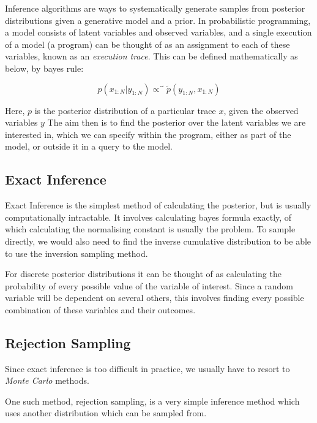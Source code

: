 Inference algorithms are ways to systematically generate samples from posterior distributions given a generative model and a prior. In probabilistic programming, a model consists of latent variables and observed variables, and a single execution of a model (a program) can be thought of as an assignment to each of these variables, known as an \textit{execution trace}. This can be defined mathematically as below, by bayes rule:

$$p(x_{1:N}|y_{1:N})\propto ̃\tilde{p}(y_{1:N},x_{1:N})$$ 

Here, $p$ is the posterior distribution of a particular trace $x$, given the observed variables $y$
The aim then is to find the posterior over the latent variables we are interested in, which we can specify within the program, either as part of the model, or outside it in a query to the model.

\subsection{Exact Inference}

Exact Inference is the simplest method of calculating the posterior, but is usually computationally intractable. It involves calculating bayes formula exactly, of which calculating the normalising constant is usually the problem. To sample directly, we would also need to find the inverse cumulative distribution to be able to use the inversion sampling method.

For discrete posterior distributions it can be thought of as calculating the probability of every possible value of the variable of interest. Since a random variable will be dependent on several others, this involves finding every possible combination of these variables and their outcomes.

\subsection{Rejection Sampling}

Since exact inference is too difficult in practice, we usually have to resort to \textit{Monte Carlo} \cite{monte-carlo} methods.

One such method, rejection sampling, is a very simple inference method which uses another distribution which can be sampled from.


